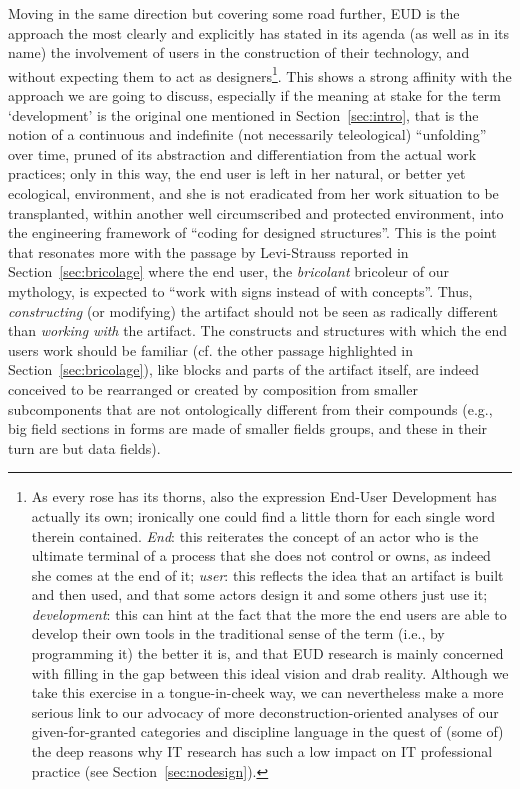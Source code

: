 \documentclass{article}
\begin{document}
Moving in the same direction but covering some road further, EUD is the approach the most clearly and explicitly has stated in its agenda (as well as in its name) the involvement of users in the construction of their technology, and without expecting them to act as designers\footnote{As every rose has its thorns, also the expression End-User Development has actually its own; ironically one could find a little thorn for each single word therein contained. \emph{End}: this reiterates the concept of an actor who is the ultimate terminal of a process that she does not control or owns, as indeed she comes at the end of it; \emph{user}: this reflects the idea that an artifact is built and then used, and that some actors design it and some others just use it; \emph{development}: this can hint at the fact that the more the end users are able to develop their own tools in the traditional sense of the term (i.e., by programming it) the better it is, and that EUD research is mainly concerned with filling in the gap between this ideal vision and drab reality. Although we take this exercise in a tongue-in-cheek way, we can nevertheless make a more serious link to our advocacy of more deconstruction-oriented analyses of our given-for-granted categories and discipline language in the quest of (some of) the deep reasons why IT research has such a low impact on IT professional practice (see Section~\ref{sec:nodesign}).}. This shows a strong affinity with the approach we are going to discuss, especially if the meaning at stake for the term `development' is the original one mentioned in Section~\ref{sec:intro}, that is the notion of a continuous and indefinite (not necessarily teleological) ``unfolding'' over time, pruned of its abstraction and differentiation from the actual work practices; only in this way, the end user is left in her natural, or better yet ecological, environment, and she is not eradicated from her work situation to be transplanted, within another well circumscribed and protected environment, into the engineering framework of ``coding for designed structures''. This is the point that resonates more with the passage by Levi-Strauss reported in Section~\ref{sec:bricolage} where the end user, the \emph{bricolant} bricoleur of our mythology, is expected to ``work with signs instead of with concepts''. Thus, \emph{constructing} (or modifying) the artifact should not be seen as radically different than \emph{working with} the artifact. The constructs and structures with which the end users work should be familiar (cf. the other passage highlighted in Section~\ref{sec:bricolage}), like blocks and parts of the artifact itself, are indeed conceived to be rearranged or created by composition from smaller subcomponents that are not ontologically different from their compounds (e.g., big field sections in forms are made of smaller fields groups, and these in their turn are but data fields).
\end{document}
